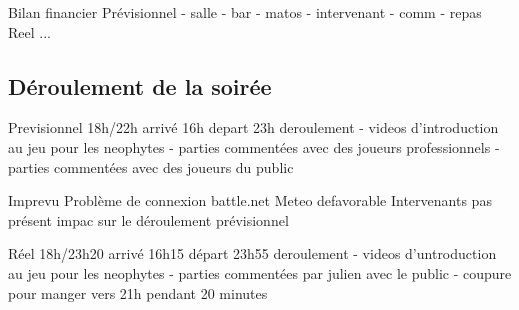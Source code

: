 Bilan financier
        Prévisionnel
            - salle
            - bar
            - matos
            - intervenant
            - comm
            - repas
        Reel
           ...

\subsection{Déroulement de la soirée}%
\label{sub:deroulement_de_la_soiree}

        Previsionnel
            18h/22h
            arrivé 16h
            depart 23h
            deroulement
                - videos d'introduction au jeu pour les neophytes
                - parties commentées avec des joueurs professionnels
                - parties commentées avec des joueurs du public

        Imprevu
           Problème de connexion battle.net
           Meteo defavorable
           Intervenants pas présent
           impac sur le déroulement prévisionnel

        Réel
            18h/23h20
            arrivé 16h15
            départ 23h55
            deroulement
                - videos d'untroduction au jeu pour les neophytes
                - parties commentées par julien avec le public
                - coupure pour manger vers 21h pendant 20 minutes

